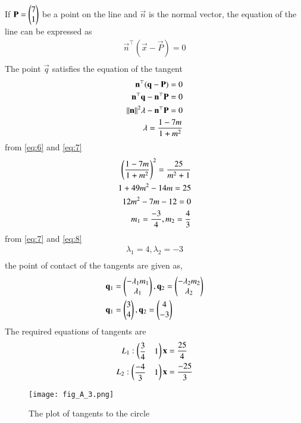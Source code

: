 \documentclass[journal,12pt,twocolumn]{IEEEtran}
\begin{document}
If $\mathbf{P} = \begin{pmatrix}7 \\ 1\end{pmatrix} $ be a point on the line and $\vec{n}$ is
the normal vector, the equation of the line can
be expressed as
\begin{align}
\vec{n}^{\top}(\vec{x} -\vec{P} ) = 0\\
\end{align}
The point $\vec{q}$ satisfies the equation of the tangent
\begin{align}
\mathbf{n}^{\top}(\mathbf{q} -\mathbf{P} ) = 0\\
\mathbf{n}^{\top}\mathbf{q} -\mathbf{n}^{\top}\mathbf{P}  = 0\\
\lVert\mathbf{n}\rVert^{2}\lambda -\mathbf{n}^{\top}\mathbf{P}  = 0\\
\lambda = \dfrac{1- 7m}{1+ m^{2}} \label{eq:7}
\end{align}
from \eqref{eq:6} and \eqref{eq:7}
\begin{align}
\left(\dfrac{1- 7m}{1+ m^{2}}\right)^{2} = \dfrac{25}{m^{2} + 1}\\
1+ 49m^{2} -14m = 25\\
12m^{2} -7m - 12=0\\
m_{1} =\dfrac{-3}{4} , m_{2} =\dfrac{4}{3} \label{eq:8}
\end{align}
from \eqref{eq:7} and \eqref{eq:8}
\begin{align}
\lambda_{1}= 4 , \lambda_{2}= -3\\
\end{align}
the point of contact of the tangents are given as,
\begin{align}
\mathbf{q}_{1} &=\begin{pmatrix}-\lambda_{1} m _{1}\\ \lambda_{1}\end{pmatrix},\mathbf{q}_{2} =\begin{pmatrix}-\lambda_{2} m _{2}\\ \lambda_{2}\end{pmatrix}\\
\mathbf{q}_{1} &=\begin{pmatrix}3\\ 4\end{pmatrix},\mathbf{q}_{2} =\begin{pmatrix}4\\-3\end{pmatrix}
\end{align}
The required equations of tangents are
\begin{align}
    L_1: \begin{pmatrix}\dfrac{3}{4}&1\end{pmatrix}\mathbf{x}&=\dfrac{25}{4}\\
    L_2: \begin{pmatrix}\dfrac{-4}{3}&1\end{pmatrix}\mathbf{x}&=\dfrac{-25}{3}
\end{align}
\begin{figure}[!ht]
   \centering
   \texttt{[image: fig\_A\_3.png]}
   \caption{The plot of tangents to the circle }
\end{figure}
\end{document}
